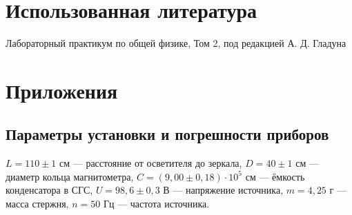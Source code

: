 \documentclass[12pt]{article}
\begin{document}
\section{Использованная литература}
\begin{thebibliography}{9}
    Лабораторный практикум по общей физике, Том 2, под редакцией А. Д. Гладуна
\end{thebibliography}

\section{Приложения}
\subsection{Параметры установки и погрешности приборов} \label{app_1}
$L = 110 \pm 1$ см --- расстояние от осветителя до зеркала,
$D = 40 \pm 1$ см --- диаметр кольца магнитометра,
$C = (9,00 \pm 0,18) \cdot 10^5$ см --- ёмкость конденсатора в СГС,
$U = 98,6 \pm 0,3$ В --- напряжение источника,
$m = 4,25$ г --- масса стержня,
$n = 50$ Гц --- частота источника. 
\end{document}
